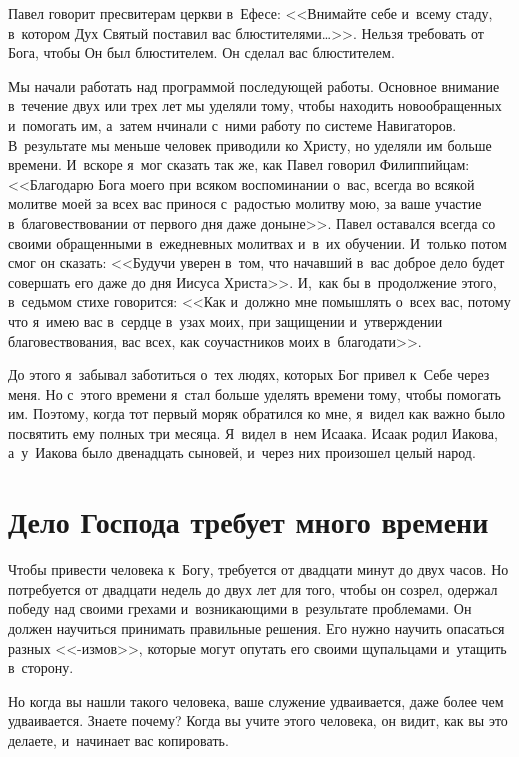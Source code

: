 \documentclass[12pt,article,a4paper,fittopage]{ncc}
\begin{document}
\begin{multicols}{2}
Павел говорит пресвитерам церкви в~Ефесе: <<Внимайте себе и~всему стаду, в~котором Дух Святый поставил вас блюстителями\ldots{}>>. Нельзя требовать от Бога, чтобы Он был блюстителем. Он сделал вас блюстителем.

Мы начали работать над программой последующей работы. Основное внимание в~течение двух или трех лет мы уделяли тому, чтобы находить новообращенных и~помогать им, а~затем нчинали с~ними работу по системе Навигаторов. В~результате мы меньше человек приводили ко Христу, но уделяли им больше времени. И~вскоре я~мог сказать так же, как Павел говорил Филиппийцам: <<Благодарю Бога моего при всяком воспоминании о~вас, всегда во всякой молитве моей за всех вас принося с~радостью молитву мою, за ваше участие в~благовествовании от первого дня даже доныне>>. Павел оставался всегда со своими обращенными в~ежедневных молитвах и~в~их обучении. И~только потом смог он сказать: <<Будучи уверен в~том, что начавший в~вас доброе дело будет совершать его даже до дня Иисуса Христа>>. И,~как бы в~продолжение этого, в~седьмом стихе говорится: <<Как и~должно мне помышлять о~всех вас, потому что я~имею вас в~сердце в~узах моих, при защищении и~утверждении благовествования, вас всех, как соучастников моих в~благодати>>.

До этого я~забывал заботиться о~тех людях, которых Бог привел к~Себе через меня. Но с~этого времени я~стал больше уделять времени тому, чтобы помогать им. Поэтому, когда тот первый моряк обратился ко мне, я~видел как важно было посвятить ему полных три месяца. Я~видел в~нем Исаака. Исаак родил Иакова, а~у~Иакова было двенадцать сыновей, и~через них произошел целый народ.

\section*{Дело Господа требует много времени}

Чтобы привести человека к~Богу, требуется от двадцати минут до двух часов. Но потребуется от двадцати недель до двух лет для того, чтобы он созрел, одержал победу над своими грехами и~возникающими в~результате проблемами. Он должен научиться принимать правильные решения. Его нужно научить опасаться разных <<-измов>>, которые могут опутать его своими щупальцами и~утащить в~сторону.

Но когда вы нашли такого человека, ваше служение удваивается, даже более чем удваивается. Знаете почему? Когда вы учите этого человека, он видит, как вы это делаете, и~начинает вас копировать. 


\end{multicols}
\end{document}
